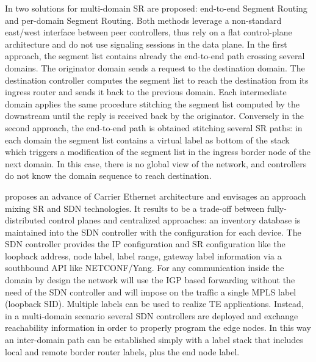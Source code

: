 In \cite{experimentalmulti} two solutions for multi-domain SR are proposed: end-to-end Segment Routing and per-domain Segment Routing. Both methods leverage a non-standard east/west interface between peer controllers, thus rely on a flat control-plane architecture and do not use signaling sessions in the data plane. In the first approach, the segment list contains already the end-to-end path crossing several domains. The originator domain sends a request to the destination domain. The destination controller computes the segment list to reach the destination from its ingress router and sends it back to the previous domain. Each intermediate domain applies the same procedure stitching the segment list computed by the downstream until the reply is received back by the originator. Conversely in the second approach, the end-to-end path is obtained stitching several SR paths: in each domain the segment list contains a virtual label as bottom of the stack which triggers a modification of the segment list in the ingress border node of the next domain. In this case, there is no global view of the network, and controllers do not know the domain sequence to reach destination. 

\cite{evolve} proposes an advance of Carrier Ethernet architecture and envisages an approach mixing SR and SDN technologies. It results to be a trade-off between fully-distributed control planes and centralized approaches: an inventory database is maintained into the SDN controller with the configuration for each device. The SDN controller provides the IP configuration and SR configuration like the loopback address, node label, label range, gateway label information via a southbound API like NETCONF/Yang. For any communication inside the domain by design the network will use the IGP based forwarding without the need of the SDN controller and will impose on the traffic a single MPLS label (loopback SID). 
Multiple labels can be used to realize TE applications.
Instead, in a multi-domain scenario several SDN controllers are deployed and exchange reachability information in order to properly program the edge nodes. In this way an inter-domain path can be established simply with a label stack that includes local and remote border router labels, plus the end node label. 


